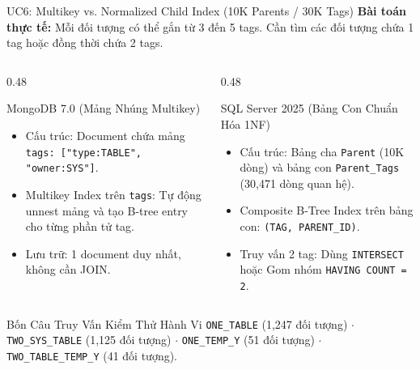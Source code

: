 \documentclass[aspectratio=169,9pt]{beamer}
\begin{document}
\begin{frame}{UC6: Multikey vs. Normalized Child Index (10K Parents / 30K Tags)}
\textbf{Bài toán thực tế:} Mỗi đối tượng có thể gắn từ 3 đến 5 tags. Cần tìm các đối tượng chứa 1 tag hoặc đồng thời chứa 2 tags.

\begin{columns}[T]
\begin{column}{0.48\textwidth}
\begin{block}{MongoDB 7.0 (Mảng Nhúng Multikey)}
\footnotesize
\begin{itemize}
  \item Cấu trúc: Document chứa mảng \texttt{tags: ["type:TABLE", "owner:SYS"]}.
  \item Multikey Index trên \texttt{tags}: Tự động unnest mảng và tạo B-tree entry cho từng phần tử tag.
  \item Lưu trữ: 1 document duy nhất, không cần JOIN.
\end{itemize}
\end{block}
\end{column}

\begin{column}{0.48\textwidth}
\begin{block}{SQL Server 2025 (Bảng Con Chuẩn Hóa 1NF)}
\footnotesize
\begin{itemize}
  \item Cấu trúc: Bảng cha \texttt{Parent} (10K dòng) và bảng con \texttt{Parent\_Tags} (30,471 dòng quan hệ).
  \item Composite B-Tree Index trên bảng con: \texttt{(TAG, PARENT\_ID)}.
  \item Truy vấn 2 tag: Dùng \texttt{INTERSECT} hoặc Gom nhóm \texttt{HAVING COUNT = 2}.
\end{itemize}
\end{block}
\end{column}
\end{columns}

\begin{exampleblock}{Bốn Câu Truy Vấn Kiểm Thử Hành Vi}
\footnotesize
\texttt{ONE\_TABLE} (1,247 đối tượng) $\cdot$ \texttt{TWO\_SYS\_TABLE} (1,125 đối tượng) $\cdot$ \texttt{ONE\_TEMP\_Y} (51 đối tượng) $\cdot$ \texttt{TWO\_TABLE\_TEMP\_Y} (41 đối tượng).
\end{exampleblock}
\end{frame}
\end{document}
